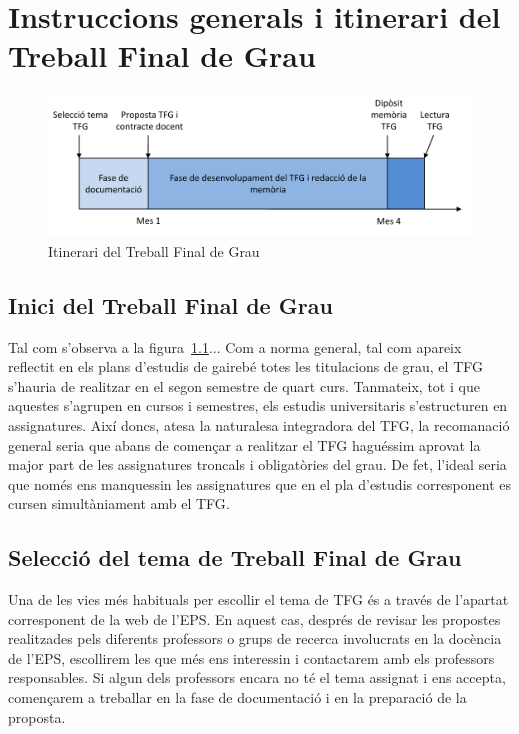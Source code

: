 
\chapter{Instruccions generals i itinerari del Treball Final de Grau }\label{instruccions}
\begin{figure}
\centering
\includegraphics[width=\linewidth]{Itinerari_TFG}
\caption{\label{fig:itinerari}Itinerari del Treball Final de Grau}
\end{figure}

\section{Inici del Treball Final de Grau}

Tal com s'observa a la figura~\ref{fig:itinerari}...
Com a norma general, tal com apareix reflectit en els plans d'estudis de gairebé totes les titulacions de grau, el \ac{TFG} s'hauria de realitzar en el segon semestre de quart curs. Tanmateix, tot i que aquestes s'agrupen en cursos i semestres, els estudis universitaris s'estructuren en assignatures. Així doncs, atesa la naturalesa integradora del \ac{TFG}, la recomanació general seria que abans de començar a realitzar el \ac{TFG} haguéssim aprovat la major part de les assignatures troncals i obligatòries del grau. De fet, l'ideal seria que només ens manquessin les assignatures que en el pla d'estudis corresponent es cursen simultàniament amb el \ac{TFG}.

\section{Selecció del tema de Treball Final de Grau}

Una de les vies més habituals per escollir el tema de \ac{TFG} és a través de l'apartat corresponent de la web de l'\acf{EPS}. En aquest cas, després de revisar les propostes realitzades pels diferents professors o grups de recerca involucrats en la docència de l'\ac{EPS}, escollirem les que més ens interessin i contactarem amb els professors responsables. Si algun dels professors encara no té el tema assignat i ens accepta, començarem a treballar en la fase de documentació i en la preparació de la proposta.

